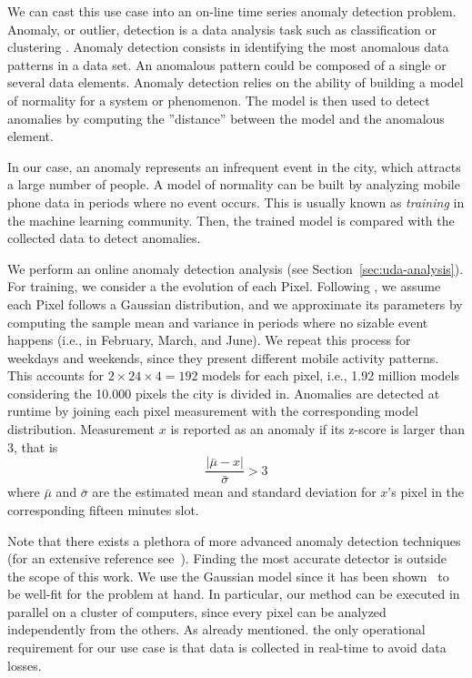 {We can cast this use case into an on-line time series anomaly detection problem. Anomaly, or outlier, detection is a data analysis task such as classification or clustering \cite{aggarwal2015outlier}. Anomaly detection consists in identifying the most anomalous data patterns in a data set. An anomalous pattern could be composed of a single or several data elements. Anomaly detection relies on the ability of building a model of normality for a system or phenomenon. The model is then used to detect anomalies by computing the ''distance'' between the model and the anomalous element.

In our case, an anomaly represents an infrequent event in the city, which attracts a large number of people. A model of normality can be built by analyzing mobile phone data in periods where no event occurs. This is usually known as \textit{training} in the machine learning community. Then, the trained model is compared with the collected data to detect anomalies.

We perform an online anomaly detection analysis (see Section~\ref{sec:uda-analysis}). 
For training, we consider a the evolution of each \textsf{Pixel}. 
Following \cite{DBLP:journals/ieeemm/BalduiniVALAC15}, we assume each \textsf{Pixel} follows a Gaussian distribution, and we approximate its parameters by computing the sample mean and variance in periods where no sizable event happens (i.e., in February, March, and June). We repeat this process for weekdays and weekends, since they present different mobile activity patterns. This accounts for $2 \times 24 \times 4 = 192$ models for each pixel, i.e., 1.92 million models considering the 10.000 pixels the city is divided in. Anomalies are detected at runtime by joining each pixel measurement with the corresponding model distribution. Measurement $x$ is reported as an anomaly if its z-score is larger than $3$, that is 
\begin{equation}
\label{eq:zscore}
  \frac{|\bar{\mu} - x|}{\bar{\sigma}} > 3
\end{equation}
where $\bar{\mu}$ and $\bar{\sigma}$ are the estimated mean and standard deviation for $x$'s pixel in the corresponding fifteen minutes slot.

Note that there exists a plethora of more advanced anomaly detection techniques (for an extensive reference see~\cite{aggarwal2015outlier}). Finding the most accurate detector is outside the scope of this work. We use the Gaussian model since it has been shown~\cite{DBLP:journals/ieeemm/BalduiniVALAC15} to be well-fit for the problem at hand. In particular, our method can be executed in parallel on a cluster of computers, since every pixel can be analyzed independently from the others. As already mentioned. the only operational requirement for our use case is that data is collected in real-time to avoid data losses.

}
